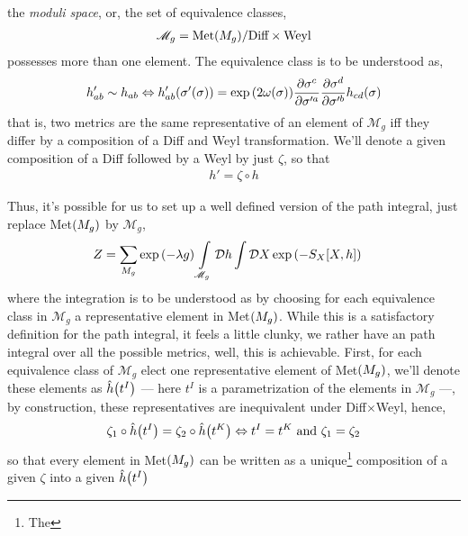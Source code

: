 the \textit{moduli space}, or, the set of equivalence classes,
\begin{align*}
    \mathscr{M}_g=\textnormal{Met}\qty(M_g)/\textnormal{Diff}\times\textnormal{Weyl}
\end{align*}
possesses more than one element. The equivalence class is to be understood as,
\begin{align*}
    h'_{ab}\sim h_{ab}\Leftrightarrow h'_{ab}\qty(\sigma'\qty(\sigma))=\exp\qty(2\omega\qty(\sigma))\pdv{ \sigma^c}{\sigma'^a}\pdv{ \sigma^d}{\sigma'^b} h_{cd}\qty( \sigma)
\end{align*}
that is, two metrics are the same representative of an element of $\mathscr M_g$ iff they differ by a composition of a Diff and Weyl transformation. We'll denote a given composition of a Diff followed by a Weyl by just $\zeta$, so that 
\begin{align*}
    h'=\zeta\circ h
\end{align*}

Thus, it's possible for us to set up a well defined version of the path integral, just replace Met$\qty(M_g)$ by $\mathscr M_g$,
\begin{align*}
    Z&=\sum\limits_{M_g}\exp\qty(-\lambda g)\int\limits_{\mathscr M_g}\mathcal D h\int\mathcal D X\exp\qty(-S_X\qty[X,h])
\end{align*}
where the integration is to be understood as by choosing for each equivalence class in $\mathscr M_g$ a representative element in Met$\qty(M_g)$. 
While this is a satisfactory definition for the path integral, it feels a little clunky, we rather have an path integral over all the possible metrics, 
well, this is achievable. First, for each equivalence class of $\mathscr M_g$ elect one representative element of Met$\qty(M_g)$, we'll denote these elements 
as $\hat h\qty(t^I)$ --- here $t^I$ is a parametrization of the elements in $\mathscr M_g$ ---, by construction, these representatives are 
inequivalent under Diff$\times$Weyl, hence,
\begin{align*}
    \zeta_1\circ \hat h\qty(t^I)=\zeta_2\circ\hat h\qty(t^K)\Leftrightarrow t^I=t^K\textnormal{ and }\zeta_1=\zeta_2
\end{align*}
so that every element in Met$\qty(M_g)$ can be written as a unique\footnote{The} composition of a given $\zeta$ into a given $\hat h\qty(t^I)$ 



